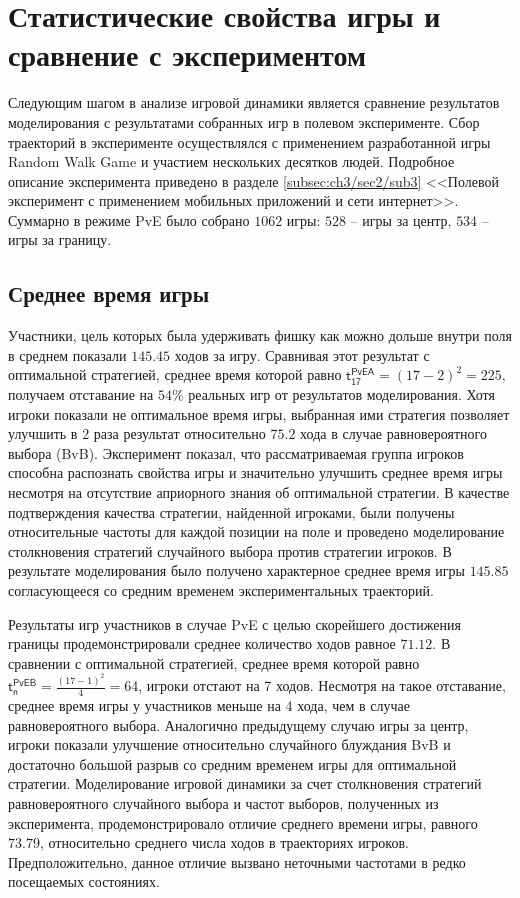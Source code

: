 \section{Статистические свойства игры и сравнение с экспериментом}\label{sec:ch3/sec4}

Следующим шагом в анализе игровой динамики является сравнение результатов моделирования с результатами собранных игр в полевом эксперименте. Сбор траекторий в эксперименте осуществлялся с применением разработанной игры Random Walk Game и участием нескольких десятков людей. Подробное описание эксперимента приведено в разделе \cref{subsec:ch3/sec2/sub3} <<Полевой эксперимент с применением мобильных приложений и сети интернет>>. Суммарно в режиме PvE было собрано $1062$ игры: $528$ -- игры за центр, $534$ -- игры за границу. 

\subsection{Среднее время игры}\label{subsec:ch3/sec4/sub1}

Участники, цель которых была удерживать фишку как можно дольше внутри поля в среднем показали $145.45$ ходов за игру. Сравнивая этот результат с оптимальной стратегией, среднее время которой равно $\boldsymbol{\mathsf{t_{17}^{PvE A}}} = (17-2)^2 = 225$, получаем отставание на $54\%$ реальных игр от результатов моделирования. Хотя игроки показали не оптимальное время игры, выбранная ими стратегия позволяет улучшить в $2$ раза результат относительно $75.2$ хода в случае равновероятного выбора (BvB). Эксперимент показал, что рассматриваемая группа игроков способна распознать свойства игры и значительно улучшить среднее время игры несмотря на отсутствие априорного знания об оптимальной стратегии. В качестве подтверждения качества стратегии, найденной игроками, были получены относительные частоты для каждой позиции на поле и проведено моделирование столкновения стратегий случайного выбора против стратегии игроков. В результате моделирования было получено характерное среднее время игры $145.85$ согласующееся со средним временем экспериментальных траекторий.

Результаты игр участников в случае PvE с целью скорейшего достижения границы продемонстрировали среднее количество ходов равное $71.12$. В сравнении с оптимальной стратегией, среднее время которой равно $\boldsymbol{\mathsf{t_n^{PvE B}}} = \frac{(17-1)^2}{4} = 64$, игроки отстают на 7 ходов. Несмотря на такое отставание, среднее время игры у участников меньше на 4 хода, чем в случае равновероятного выбора. Аналогично предыдущему случаю игры за центр, игроки показали улучшение относительно случайного блуждания BvB и достаточно большой разрыв со средним временем игры для оптимальной стратегии. Моделирование игровой динамики за счет столкновения стратегий равновероятного случайного выбора и частот выборов, полученных из эксперимента, продемонстрировало отличие среднего времени игры, равного $73.79$, относительно среднего числа ходов в траекториях игроков. Предположительно, данное отличие вызвано неточными частотами в редко посещаемых состояниях. 

